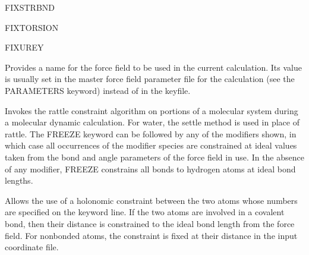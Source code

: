 \documentclass[letterpaper,11pt,english]{sphinxmanual}
\begin{document}
\ignorespaces {}\label{\detokenize{text/keywords:key-fix-strbnd}}
\sphinxAtStartPar
FIX\sphinxhyphen{}STRBND

\ignorespaces {}\label{\detokenize{text/keywords:key-fix-torsion}}
\sphinxAtStartPar
FIX\sphinxhyphen{}TORSION

\ignorespaces {}\label{\detokenize{text/keywords:key-fix-urey}}
\sphinxAtStartPar
FIX\sphinxhyphen{}UREY

\ignorespaces {}\label{\detokenize{text/keywords:key-forcefield}}\begin{description}
\sphinxAtStartPar
Provides a name for the force field to be used in the current calculation. Its value is usually set in the master force field parameter file for the calculation (see the PARAMETERS keyword) instead of in the keyfile.

\end{description}

\ignorespaces {}\label{\detokenize{text/keywords:key-freeze}}\begin{description}
\sphinxAtStartPar
Invokes the rattle constraint algorithm on portions of a molecular system during a molecular dynamic calculation. For water, the settle method is used in place of rattle. The FREEZE keyword can be followed by any of the modifiers shown, in which case all occurrences of the modifier species are constrained at ideal values taken from the bond and angle parameters of the force field in use. In the absence of any modifier, FREEZE constrains all bonds to hydrogen atoms at ideal bond lengths.

\end{description}

\ignorespaces {}\label{\detokenize{text/keywords:key-freeze-distance}}\begin{description}
\sphinxAtStartPar
Allows the use of a holonomic constraint between the two atoms whose numbers are specified on the keyword line. If the two atoms are involved in a covalent bond, then their distance is constrained to the ideal bond length from the force field. For nonbonded atoms, the constraint is fixed at their distance in the input coordinate file.

\end{description}
\end{document}
